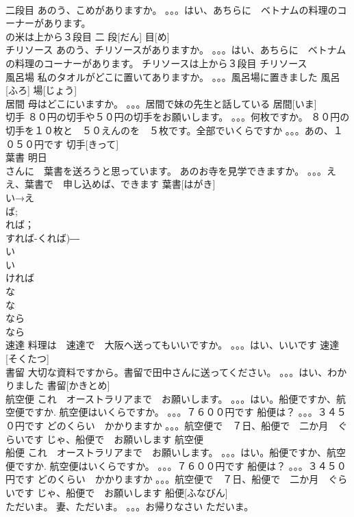 \documentclass[8pt]{extreport}
\begin{document}
\begin{CJK}{UTF8}{min}
\\	二段目	あのう、こめがありますか。 。。。はい、あちらに　ベトナムの料理のコーナーがあります。 
\\	の米は上から３段目	二 段[だん] 目[め]			
\\	チリソース	あのう、チリソースがありますか。 。。。はい、あちらに　ベトナムの料理のコーナーがあります。 チリソースは上から３段目	チリソース						
\\	風呂場	私のタオルがどこに置いてありますか。 。。。風呂場に置きました	風呂[ふろ] 場[じょう]			
\\	居間	母はどこにいますか。 。。。居間で妹の先生と話している	居間[いま]			
\\	切手	８０円の切手や５０円の切手をお願いします。 。。。何枚ですか。 ８０円の切手を１０枚と　５０えんのを　５枚です。全部でいくらですか 。。。あの、１０５０円です	切手[きって]			
\\	葉書	明日　
\\	さんに　葉書を送ろうと思っています。 あのお寺を見学できますか。 。。。ええ、葉書で　申し込めば、できます	葉書[はがき]			
\\	い→え
\\	ば;
\\	れば；
\\	すれば-くれば)―　
\\	い
\\	い　
\\	ければ　
\\	な 
\\	な
\\	なら　
\\	なら
\\	速達	料理は　速達で　大阪へ送ってもいいですか。 。。。はい、いいです	速達[そくたつ]			
\\	書留	大切な資料ですから。書留で田中さんに送ってください。 。。。はい、わかりました	書留[かきとめ]			
\\	航空便	これ　オーストラリアまで　お願いします。 。。。はい。船便ですか、航空便ですか. 航空便はいくらですか。 。。。７６００円です 船便は？ 。。。３４５０円です どのくらい　かかりますか 。。。航空便で　７日、船便で　二か月　ぐらいです じゃ、船便で　お願いします	航空便			
\\	船便	これ　オーストラリアまで　お願いします。 。。。はい。船便ですか、航空便ですか. 航空便はいくらですか。 。。。７６００円です 船便は？ 。。。３４５０円です どのくらい　かかりますか 。。。航空便で　７日、船便で　二か月　ぐらいです じゃ、船便で　お願いします	船便[ふなびん]			
\\	ただいま。	妻、ただいま。 。。。お帰りなさい	ただいま。			

\end{CJK}
\end{document}
